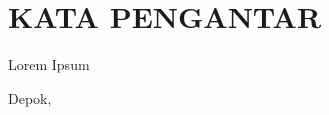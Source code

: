 \chapter*{KATA PENGANTAR}

Lorem Ipsum

\vspace*{0.1cm}
\begin{flushright}
	Depok, \tanggalSiapSidang\\[0.1cm]
	\vspace*{1cm}
	\penulis

\end{flushright}
